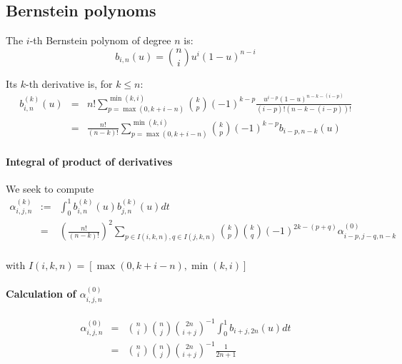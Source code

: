 \documentclass {article}
\newcommand\bernstein[2]{b_{#1, #2}}
\begin{document}
\subsection {Bernstein polynoms}
The $i$-th Bernstein polynom of degree $n$ is:
$$
\bernstein{i}{n} (u) = { n \choose i } u^i (1-u)^{n-i}
$$

Its $k$-th derivative is, for $k \le n$:
\begin{eqnarray*}
\bernstein{i}{n}^{(k)} (u) &=& n! \sum_{p = \max(0, k+i-n)}^{\min(k,i)} { k \choose p } (-1)^{k-p} \frac{u^{i-p} (1-u)^{n-k-(i-p)}}{(i-p)!(n-k-(i-p))!} \\
&=& \frac{n!}{(n-k)!} \sum_{p = \max(0, k+i-n)}^{\min(k,i)} { k \choose p } (-1)^{k-p} \bernstein{i-p}{n-k}(u)
\end{eqnarray*}

\paragraph{Integral of product of derivatives}
We seek to compute
\begin{eqnarray*}
  \alpha_{i,j,n}^{(k)} &:=& \int_0^1 \bernstein{i}{n}^{(k)}(u) \bernstein{j}{n}^{(k)} (u) dt \\
& =& \left(\frac{n!}{(n-k)!}\right)^2 \sum_{p \in I(i,k,n), q \in I(j,k,n)} { k \choose p } { k \choose q } (-1)^{2k - (p+q)} \alpha_{i-p,j-q,n-k}^{(0)} \\
\end{eqnarray*}

with $I(i,k,n) = [ \max(0, k+i-n), \min(k,i) ]$


\paragraph{Calculation of $\alpha_{i,j,n}^{(0)}$}
\begin{eqnarray*}
  \alpha_{i,j,n}^{(0)}
  &=& { n \choose i } { n \choose j } { 2n \choose i+j }^{-1} \int_0^1 \bernstein{i+j}{2n}(u) dt \\
  &=& { n \choose i } { n \choose j } { 2n \choose i+j }^{-1} \frac{1}{2n + 1}
\end{eqnarray*}

\end{document}
